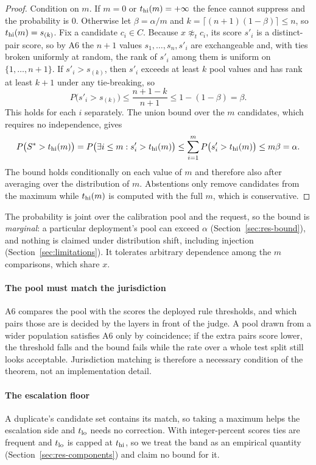 \begin{proof}
Condition on $m$. If $m=0$ or $t_{\mathrm{hi}}(m)=+\infty$ the fence cannot suppress and the probability is $0$. Otherwise let $\beta=\alpha/m$ and $k=\lceil(n+1)(1-\beta)\rceil\le n$, so $t_{\mathrm{hi}}(m)=s_{(k)}$. Fix a candidate $c_i\in C$. Because $x\not\approx_t c_i$, its score $s'_i$ is a distinct-pair score, so by A6 the $n+1$ values $s_1,\dots,s_n,s'_i$ are exchangeable and, with ties broken uniformly at random, the rank of $s'_i$ among them is uniform on $\{1,\dots,n+1\}$. If $s'_i>s_{(k)}$, then $s'_i$ exceeds at least $k$ pool values and has rank at least $k+1$ under any tie-breaking, so
\[
P\big(s'_i>s_{(k)}\big)\le\frac{n+1-k}{n+1}\le 1-(1-\beta)=\beta .
\]
This holds for each $i$ separately. The union bound over the $m$ candidates, which requires no independence, gives
\[
P\big(S^\ast>t_{\mathrm{hi}}(m)\big)=P\big(\exists i\le m: s'_i>t_{\mathrm{hi}}(m)\big)\le\sum_{i=1}^m P\big(s'_i>t_{\mathrm{hi}}(m)\big)\le m\beta=\alpha .
\]
The bound holds conditionally on each value of $m$ and therefore also after averaging over the distribution of $m$. Abstentions only remove candidates from the maximum while $t_{\mathrm{hi}}(m)$ is computed with the full $m$, which is conservative.
\end{proof}

The probability is joint over the calibration pool and the request, so the bound is \emph{marginal}: a particular deployment's pool can exceed $\alpha$ (Section~\ref{sec:res-bound}), and nothing is claimed under distribution shift, including injection (Section~\ref{sec:limitations}). It tolerates arbitrary dependence among the $m$ comparisons, which share $x$.

\paragraph{The pool must match the jurisdiction}
A6 compares the pool with the scores the deployed rule thresholds, and which pairs those are is decided by the layers in front of the judge. A pool drawn from a wider population satisfies A6 only by coincidence; if the extra pairs score lower, the threshold falls and the bound fails while the rate over a whole test split still looks acceptable. Jurisdiction matching is therefore a necessary condition of the theorem, not an implementation detail.

\paragraph{The escalation floor}
A duplicate's candidate set contains its match, so taking a maximum helps the escalation side and $t_{\mathrm{lo}}$ needs no correction. With integer-percent scores ties are frequent and $t_{\mathrm{lo}}$ is capped at $t_{\mathrm{hi}}$, so we treat the band as an empirical quantity (Section~\ref{sec:res-components}) and claim no bound for it.

